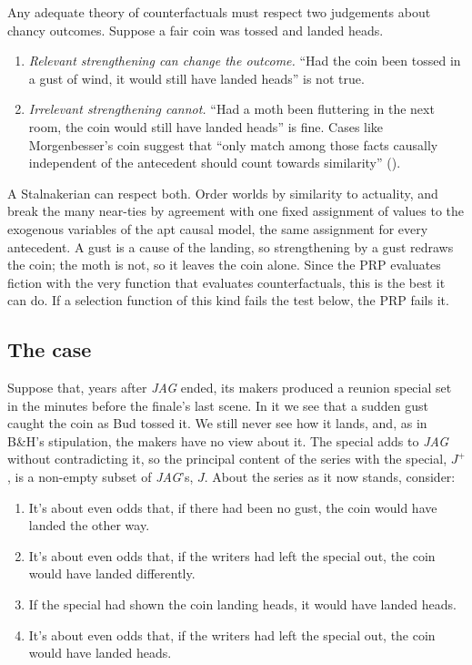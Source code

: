 \documentclass[
  11pt,
  letterpaper,
  DIV=11,
  numbers=noendperiod,
  twoside]{scrartcl}
\providecommand{\tightlist}{%
  \setlength{\itemsep}{0pt}\setlength{\parskip}{0pt}}
\begin{document}
Any adequate theory of counterfactuals must respect two judgements about
chancy outcomes. Suppose a fair coin was tossed and landed heads.

\begin{enumerate}
\def\labelenumi{\arabic{enumi}.}
\tightlist
\item
  \emph{Relevant strengthening can change the outcome.} ``Had the coin
  been tossed in a gust of wind, it would still have landed heads'' is
  not true.
\item
  \emph{Irrelevant strengthening cannot.} ``Had a moth been fluttering
  in the next room, the coin would still have landed heads'' is fine.
  Cases like Morgenbesser's coin suggest that ``only match among those
  facts causally independent of the antecedent should count towards
  similarity'' ().
\end{enumerate}

A Stalnakerian can respect both. Order worlds by similarity to
actuality, and break the many near-ties by agreement with one fixed
assignment of values to the exogenous variables of the apt causal model,
the same assignment for every antecedent. A gust is a cause of the
landing, so strengthening by a gust redraws the coin; the moth is not,
so it leaves the coin alone. Since the PRP evaluates fiction with the
very function that evaluates counterfactuals, this is the best it can
do. If a selection function of this kind fails the test below, the PRP
fails it.

\subsection{The case}\label{the-case}

Suppose that, years after \emph{JAG} ended, its makers produced a
reunion special set in the minutes before the finale's last scene. In it
we see that a sudden gust caught the coin as Bud tossed it. We still
never see how it lands, and, as in B\&H's stipulation, the makers have
no view about it. The special adds to \emph{JAG} without contradicting
it, so the principal content of the series with the special, \(J^{+}\),
is a non-empty subset of \emph{JAG}'s, \(J\). About the series as it now
stands, consider:

\begin{enumerate}
\def\labelenumi{(\Alph{enumi})}
\item
  It's about even odds that, if there had been no gust, the coin would
  have landed the other way.
\item
  It's about even odds that, if the writers had left the special out,
  the coin would have landed differently.
\item
  If the special had shown the coin landing heads, it would have landed
  heads.
\item
  It's about even odds that, if the writers had left the special out,
  the coin would have landed heads.
\end{enumerate}
\end{document}
